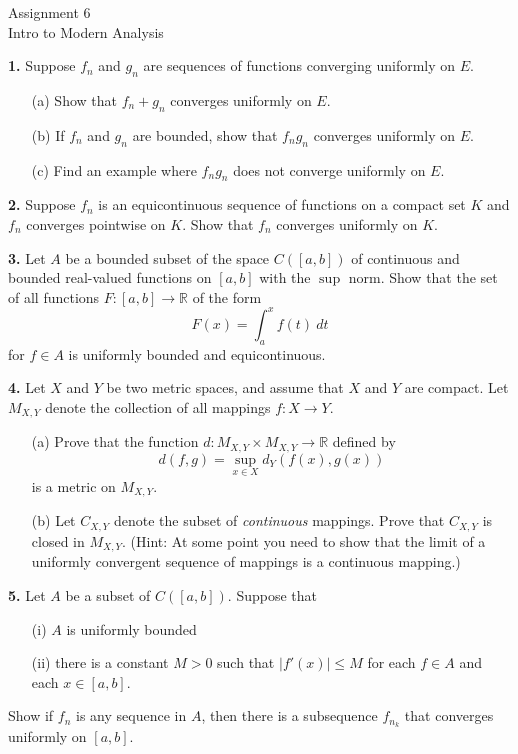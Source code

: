 \documentclass[12pt]{article}
\begin{document}
\begin{center}
Assignment 6\\
Intro to Modern Analysis
\end{center}



\noindent \textbf{1.} Suppose $f_n$ and $g_n$ are sequences of functions converging uniformly on $E$. 
\begin{enumerate}
\item[(a)] Show that $f_n + g_n$ converges uniformly on $E$. 
\item[(b)] If $f_n$ and $g_n$ are bounded, show that $f_ng_n$ converges uniformly on $E$. 
\item[(c)] Find an example where $f_ng_n$ does not converge uniformly on $E$. 
\end{enumerate}

\medskip

\noindent \textbf{2.} Suppose $f_n$ is an equicontinuous sequence of functions on a compact set $K$ and $f_n$ converges pointwise on $K$. Show that $f_n$ converges uniformly on $K$. 

\medskip

\noindent \textbf{3.} Let $A$ be a bounded subset of the space $C([a,b])$ of continuous and bounded real-valued functions on $[a,b]$ with the $\sup$ norm. Show that the set of all functions $F : [a,b] \to \mathbb{R}$ of the form 
\[
F(x) = \int_a^x f(t) \: dt
\]
for $f \in A$ is uniformly bounded and equicontinuous. 

\medskip

\noindent \textbf{4.} Let $X$ and $Y$ be two metric spaces, and assume that $X$ and $Y$ are compact. Let $M_{X,Y}$ denote the collection of all mappings $f : X \to Y$. 
\begin{enumerate}
\item[(a)] Prove that the function $d : M_{X,Y} \times M_{X,Y} \to \mathbb{R}$ defined by 
\[
d(f,g) = \sup_{x \in X} d_Y(f(x), g(x))
\]
is a metric on $M_{X,Y}$. 
\item[(b)] Let $C_{X,Y}$ denote the subset of \emph{continuous} mappings. Prove that $C_{X,Y}$ is closed in $M_{X,Y}$. (Hint: At some point you need to show that the limit of a uniformly convergent sequence of mappings is a continuous mapping.)
\end{enumerate}




\medskip

\noindent \textbf{5.} Let $A$ be a subset of $C([a,b])$. Suppose that 
\begin{enumerate}
\item[(i)] $A$ is uniformly bounded 
\item[(ii)] there is a constant $M > 0$ such that $|f'(x)| \leqslant M$ for each $f \in A$ and each $x \in [a,b]$. 
\end{enumerate}
Show if $f_n$ is any sequence in $A$, then there is a subsequence $f_{n_k}$ that converges uniformly on $[a,b]$. 
\end{document}
